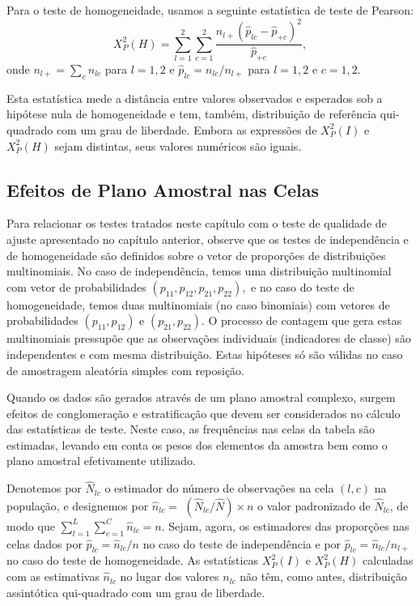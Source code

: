 \documentclass[]{book}
\numberwithin{example}{chapter}
\numberwithin{remark}{chapter}
\numberwithin{definition}{chapter}
\begin{document}
Para o teste de homogeneidade, usamos a seguinte estatística de teste de
Pearson: \[
X_{P}^{2}\left( H\right) =\sum\limits_{l=1}^{2}\sum\limits_{c=1}^{2}\frac{
n_{l+}\left( \widehat{p}_{lc}-\hat{p}_{+c}\right) ^{2}}{\hat{p}_{+c}},
\] onde \(n_{l+}=\sum\nolimits_{c}n_{lc}\) para \(l=1,2\) e
\(\widehat{p} _{lc}=n_{lc}/n_{l+}\) para \(l=1,2\) e \(c=1,2\).

Esta estatística mede a distância entre valores observados e esperados
sob a hipótese nula de homogeneidade e tem, também, distribuição de
referência qui-quadrado com um grau de liberdade. Embora as expressões
de \(X_{P}^{2}\left( I\right)\) e \(X_{P}^{2}\left( H\right)\) sejam
distintas, seus valores numéricos são iguais.

\subsection{Efeitos de Plano Amostral nas
Celas}\label{efeitos-de-plano-amostral-nas-celas}

Para relacionar os testes tratados neste capítulo com o teste de
qualidade de ajuste apresentado no capítulo anterior, observe que os
testes de independência e de homogeneidade são definidos sobre o vetor
de proporções de distribuições multinomiais. No caso de independência,
temos uma distribuição multinomial com vetor de probabilidades
\(\left( p_{11},p_{12},p_{21},p_{22}\right) ,\) e no caso do teste de
homogeneidade, temos duas multinomiais (no caso binomiais) com vetores
de probabilidades \(\left( p_{11},p_{12}\right)\) e
\(\left( p_{21},p_{22}\right)\). O processo de contagem que gera estas
multinomiais pressupõe que as observações individuais (indicadores de
classe) são independentes e com mesma distribuição. Estas hipóteses só
são válidas no caso de amostragem aleatória simples com reposição.

Quando os dados são gerados através de um plano amostral complexo,
surgem efeitos de conglomeração e estratificação que devem ser
considerados no cálculo das estatísticas de teste. Neste caso, as
frequências nas celas da tabela são estimadas, levando em conta os pesos
dos elementos da amostra bem como o plano amostral efetivamente
utilizado.

Denotemos por \(\hat{N}_{lc}\) o estimador do número de observações na
cela \(\left( l,c\right)\) na população, e designemos por
\(\hat{n}_{lc}=\) \(\left( \hat{N}_{lc}/\hat{N}\right) \times n\) o
valor padronizado de \(\hat{N}_{lc}\), de modo que
\(\sum\limits_{l=1}^{L}\sum\limits_{c=1}^{C}\hat{n}_{lc}=n\). Sejam,
agora, os estimadores das proporções nas celas dados por
\(\hat{p}_{lc}=\hat{n}_{lc}/n\) no caso do teste de independência e por
\(\hat{p}_{lc}=\hat{n}_{lc}/n_{l+}\) no caso do teste de homogeneidade.
As estatísticas \(X_{P}^{2}\left( I\right)\) e
\(X_{P}^{2}\left(H\right)\) calculadas com as estimativas
\(\hat{n}_{lc}\) no lugar dos valores \(n_{lc}\) não têm, como antes,
distribuição assintótica qui-quadrado com um grau de liberdade.
\end{document}
